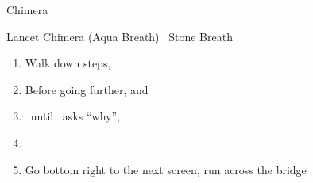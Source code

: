 \begin{battle}{Chimera}
    \begin{itemize}
        \kimahrif Lancet Chimera (Aqua Breath)
        \kimahrif \od\ Stone Breath
    \end{itemize}
\end{battle}
\winvfill
\begin{enumerate}[resume]
    \item Walk down steps, \cs[1:30]
    \item Before going further,  and 
    \item \sd\ until \tidus\ asks ``why'', \cs[6:20]
    \item \formation{\tidus}{\rikku}{\kimahri}
    \item Go bottom right to the next screen, run across the bridge
\end{enumerate}